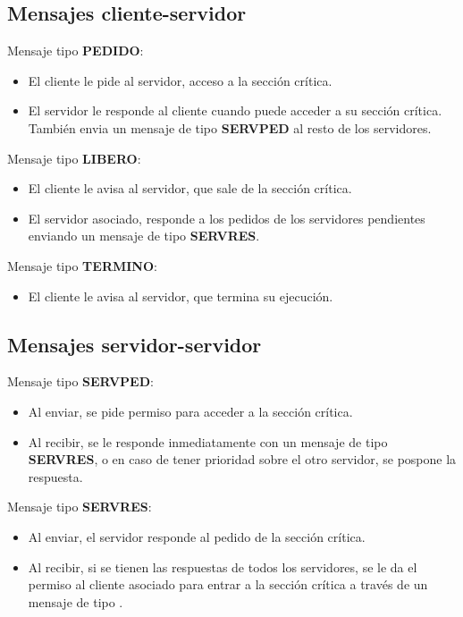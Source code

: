 \documentclass[a4paper, 10pt]{article}
\begin{document}
\subsection{Mensajes cliente-servidor}
Mensaje tipo \textbf{PEDIDO}: 
\begin{itemize}
\item El cliente le pide al servidor, acceso a la secci\'on cr\'itica.
\item El servidor le responde al cliente cuando puede acceder a su secci\'on cr\'itica. Tambi\'en envia un mensaje de tipo \textbf{SERVPED} al resto de los servidores.
\end{itemize}

Mensaje tipo \textbf{LIBERO}: 
\begin{itemize}
\item El cliente le avisa al servidor, que sale de la secci\'on cr\'itica.
\item El servidor asociado, responde a los pedidos de los servidores pendientes enviando un mensaje de tipo \textbf{SERVRES}.
\end{itemize}

Mensaje tipo \textbf{TERMINO}: 
\begin{itemize}
\item El cliente le avisa al servidor, que termina su ejecuci\'on.
\end{itemize}

\newpage

\subsection{Mensajes servidor-servidor}
Mensaje tipo \textbf{SERVPED}: 
\begin{itemize}
\item Al enviar, se pide permiso para acceder a la secci\'on cr\'itica.
\item Al recibir, se le responde inmediatamente con un mensaje de tipo \textbf{SERVRES}, o en caso de tener prioridad sobre el otro servidor, se pospone la respuesta.
\end{itemize}

Mensaje tipo \textbf{SERVRES}:
\begin{itemize}
\item Al enviar, el servidor responde al pedido de la secci\'on cr\'itica.
\item Al recibir, si se tienen las respuestas de todos los servidores, se le da el permiso al cliente asociado para entrar a la secci\'on cr\'itica a trav\'es de un mensaje de tipo .
\end{itemize}
\vspace*{4em}
\end{document}
